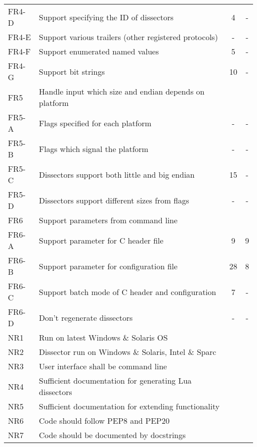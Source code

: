 \begin{table}[ht]
\begin{tabularx}{\textwidth}{l X c c}
	FR4-D & Support specifying the ID of dissectors & 4 & - \\
	FR4-E & Support various trailers (other registered protocols) & - & - \\
	FR4-F & Support enumerated named values  & 5 & - \\
	FR4-G & Support bit strings & 10 & - \\
	\addlinespace
	FR5 & Handle input which size and endian depends on platform & & \\
	FR5-A & Flags specified for each platform & - & - \\
	FR5-B & Flags which signal the platform & - & - \\
	FR5-C & Dissectors support both little and big endian & 15 & - \\
	FR5-D & Dissectors support different sizes from flags & - & - \\	
	\addlinespace
	FR6 & Support parameters from command line & & \\
	FR6-A & Support parameter for C header file & 9 & 9 \\
	FR6-B & Support parameter for configuration file & 28 & 8 \\
	FR6-C & Support batch mode of C header and configuration & 7 & - \\
	FR6-D & Don't regenerate dissectors & - & - \\
	\addlinespace
	NR1 & Run on latest Windows \& Solaris OS & & \\
	NR2 & Dissector run on Windows \& Solaris, Intel \& Sparc & & \\
	NR3 & User interface shall be command line & & \\
	NR4 & Sufficient documentation for generating Lua dissectors & & \\
	NR5 & Sufficient documentation for extending functionality & & \\
	NR6 & Code should follow PEP8 and PEP20 & & \\
	NR7 & Code should be documented by docstrings & & \\
	\bottomrule
\end{tabularx}
\end{table}

